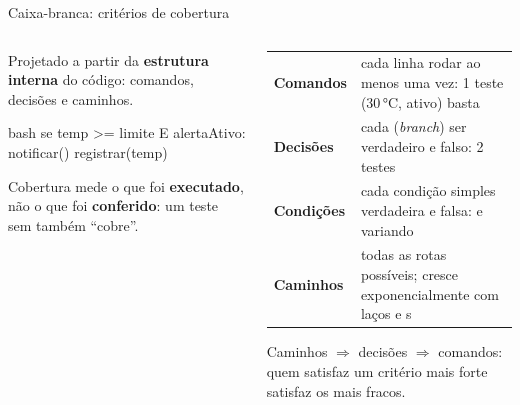 \begin{frame}[fragile]{Caixa-branca: critérios de cobertura}
  \begin{columns}[T]
    \begin{column}{0.46\textwidth}
      \begin{definicao}
        Projetado a partir da \textbf{estrutura interna} do código: comandos, decisões e caminhos.
      \end{definicao}
\begin{codigo}[title=Pseudocódigo]{bash}
se temp >= limite E alertaAtivo:
    notificar()
registrar(temp)
\end{codigo}
      \begin{atencao}
        Cobertura mede o que foi \textbf{executado}, não o que foi \textbf{conferido}: um teste sem  também ``cobre''.
      \end{atencao}
    \end{column}
    \begin{column}{0.52\textwidth}
      \scriptsize
      \begin{tabularx}{\linewidth}{@{}p{2.1cm} L@{}}
        \toprule
         &  \\
        \midrule
        \textbf{Comandos} & cada linha rodar ao menos uma vez: 1 teste (30\,°C, ativo) basta \\
        \textbf{Decisões} & cada  (\emph{branch}) ser verdadeiro e falso: 2 testes \\
        \textbf{Condições} & cada condição simples verdadeira e falsa:  e  variando \\
        \textbf{Caminhos} & todas as rotas possíveis; cresce exponencialmente com laços e s \\
        \bottomrule
      \end{tabularx}
      \begin{conceito}[Hierarquia]
        Caminhos $\Rightarrow$ decisões $\Rightarrow$ comandos: quem satisfaz um critério mais forte satisfaz os mais fracos.
      \end{conceito}
    \end{column}
  \end{columns}
\end{frame}

